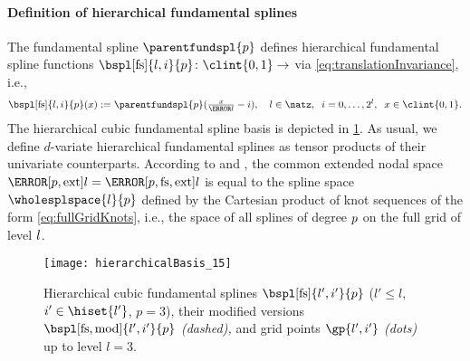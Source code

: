 \paragraph{Definition of hierarchical fundamental splines}

The fundamental spline $\parentfundspl{p}$ defines
hierarchical fundamental spline functions
$\bspl[\fs]{l,i}{p}\colon \clint{0, 1} \to \real$ via
\cref{eq:translationInvariance}, i.e.,
\begin{equation}
  \bspl[\fs]{l,i}{p}(x)
  := \parentfundspl{p}(\tfrac{x}{\ms{l}} - i),\quad
  l \in \natz,\;\;
  i = 0, \dotsc, 2^l,\;\;
  x \in \clint{0, 1}.
\end{equation}
The hierarchical cubic fundamental spline basis is depicted in
\cref{fig:hierarchicalFundamentalSpline}.
As usual, we define $d$-variate hierarchical fundamental splines
as tensor products of their univariate counterparts.
According to  and ,
the common extended nodal space
$\nsbspl[\ext]{\*l}{\*p} = \nsbspl[\fs,\ext]{\*l}{\*p}$
is equal to the spline space $\wholesplspace{\*l}{\*p}$
defined by the Cartesian product of
knot sequences of the form \eqref{eq:fullGridKnots},
i.e., the space of all splines of degree $\*p$ on the full grid of level $\*l$.

\begin{SCfigure}
  \texttt{[image: hierarchicalBasis\_15]}%
  \caption[%
    Hierarchical fundamental splines%
  ]{%
    Hierarchical cubic fundamental splines
    $\bspl[\fs]{l',i'}{p}$
    ($l' \le l$, $i' \in \hiset{l'}$, $p = 3$),
    their modified versions $\bspl[\fs,\modified]{l',i'}{p}$
    \emph{(dashed),} and
    grid points $\gp{l',i'}$ \emph{(dots)} up to level $l = 3$.%
  }%
  \label{fig:hierarchicalFundamentalSpline}%
\end{SCfigure}

